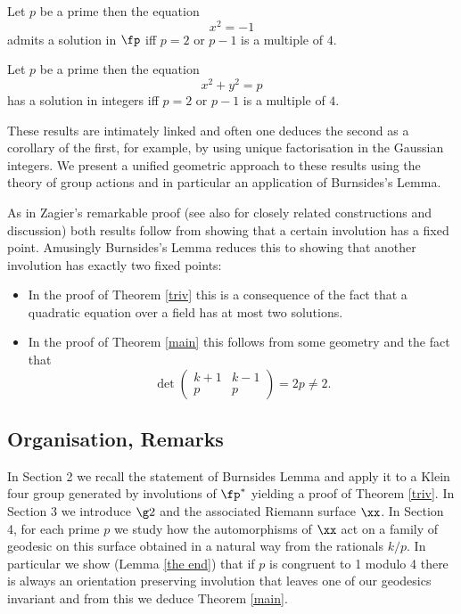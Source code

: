 
\begin{thm}\label{triv}
Let $p$ be a prime then the equation
$$x^2 = -1$$
admits a solution in $\fp$ iff 
$p =2$ or $p-1$ is a multiple of $4$.
\end{thm}


\begin{thm}[Fermat]\label{main}
Let $p$ be a prime then the equation
$$x^2 + y^2 = p $$
has a solution in integers  iff  $p =2$ or $p-1$ is a multiple of $4$.
\end{thm}

These results are intimately linked and often one deduces the second as a corollary of the first,
 for example, by using unique factorisation in the Gaussian integers.  We present a unified geometric  approach to these results  using the theory of group actions and in particular an application of Burnsides's Lemma. 
 
 
As in Zagier's remarkable proof \cite{zagier} 
(see also \cite{heath,north,aigner2,elsholtz} for closely related constructions and discussion)
both results follow from showing that a certain involution has a fixed point. Amusingly Burnsides's Lemma reduces this to showing that another involution has exactly two fixed points:
\begin{itemize}
\item  In the proof of Theorem \ref{triv} this is a consequence of the fact that a quadratic equation 
over a field has at most two solutions.
\item In the proof of Theorem \ref{main} this follows from some geometry and the fact that 
$$ \det 
\begin{pmatrix}
k + 1 & k- 1\\
p & p 
\end{pmatrix} = 2p \neq 2.
$$
 \end{itemize}


\subsection{Organisation, Remarks}

In Section 2 we recall the statement of Burnsides Lemma 
and apply it to a Klein four group generated by involutions of $\fp^*$
yielding a proof of Theorem \ref{triv}. In Section 3 we introduce $\g2$
and the associated Riemann surface $\xx$. 
In Section 4, for each prime $p$
we study how the automorphisms of $\xx$ 
act on a family of geodesic on this surface
obtained in a natural way from the rationals $k/p$.
In particular we show (Lemma \ref{the end})  that if $p$ is congruent to 1 modulo 4
there is always an orientation preserving involution that
leaves one of our geodesics invariant
and from this we deduce Theorem \ref{main}.

